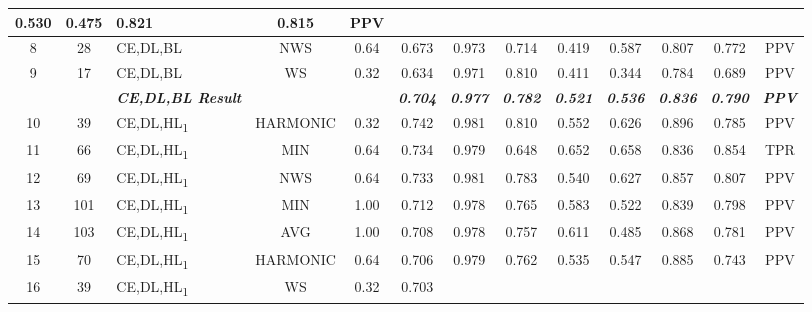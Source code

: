 \begin{table}[H]
{\begin{tabular}{cc|l|cc|c|c|c|c|c|c|c|c|}
    0.530 &
    0.475 &
    0.821 &
    0.815 &
    PPV \\ \hline
  \multicolumn{1}{|c|}{8} &
    28 &
    CE,DL,BL &
    \multicolumn{1}{c|}{NWS} &
    0.64 &
    0.673 &
    0.973 &
    0.714 &
    0.419 &
    0.587 &
    0.807 &
    0.772 &
    PPV \\ \hline
  \multicolumn{1}{|c|}{9} &
    17 &
    CE,DL,BL &
    \multicolumn{1}{c|}{WS} &
    0.32 &
    0.634 &
    0.971 &
    0.810 &
    0.411 &
    0.344 &
    0.784 &
    0.689 &
    PPV \\ \hline
   &
    \textit{\textbf{}} &
    \textit{\textbf{CE,DL,BL Result}} &
     &
     &
    \textit{\textbf{0.704}} &
    \textit{\textbf{0.977}} &
    \textit{\textbf{0.782}} &
    \textit{\textbf{0.521}} &
    \textit{\textbf{0.536}} &
    \textit{\textbf{0.836}} &
    \textit{\textbf{0.790}} &
    \textit{\textbf{PPV}} \\ \hline
  \multicolumn{1}{|c|}{10} &
    39 &
    CE,DL,HL\textsubscript{1} &
    \multicolumn{1}{c|}{HARMONIC} &
    0.32 &
    0.742 &
    0.981 &
    0.810 &
    0.552 &
    0.626 &
    0.896 &
    0.785 &
    PPV \\ \hline
  \multicolumn{1}{|c|}{11} &
    66 &
    CE,DL,HL\textsubscript{1} &
    \multicolumn{1}{c|}{MIN} &
    0.64 &
    0.734 &
    0.979 &
    0.648 &
    0.652 &
    0.658 &
    0.836 &
    0.854 &
    TPR \\ \hline
  \multicolumn{1}{|c|}{12} &
    69 &
    CE,DL,HL\textsubscript{1} &
    \multicolumn{1}{c|}{NWS} &
    0.64 &
    0.733 &
    0.981 &
    0.783 &
    0.540 &
    0.627 &
    0.857 &
    0.807 &
    PPV \\ \hline
  \multicolumn{1}{|c|}{13} &
    101 &
    CE,DL,HL\textsubscript{1} &
    \multicolumn{1}{c|}{MIN} &
    1.00 &
    0.712 &
    0.978 &
    0.765 &
    0.583 &
    0.522 &
    0.839 &
    0.798 &
    PPV \\ \hline
  \multicolumn{1}{|c|}{14} &
    103 &
    CE,DL,HL\textsubscript{1} &
    \multicolumn{1}{c|}{AVG} &
    1.00 &
    0.708 &
    0.978 &
    0.757 &
    0.611 &
    0.485 &
    0.868 &
    0.781 &
    PPV \\ \hline
  \multicolumn{1}{|c|}{15} &
    70 &
    CE,DL,HL\textsubscript{1} &
    \multicolumn{1}{c|}{HARMONIC} &
    0.64 &
    0.706 &
    0.979 &
    0.762 &
    0.535 &
    0.547 &
    0.885 &
    0.743 &
    PPV \\ \hline
  \multicolumn{1}{|c|}{16} &
    39 &
    CE,DL,HL\textsubscript{1} &
    \multicolumn{1}{c|}{WS} &
    0.32 &
    0.703 &

\end{tabular}}
\end{table}
